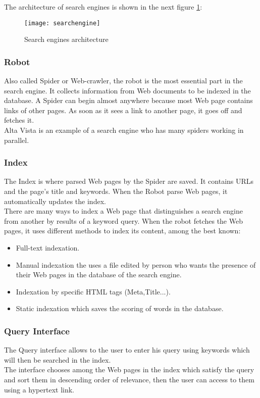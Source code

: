 The architecture of search engines is shown in the next figure \ref{fig_search_engine}:

\begin{figure}[H]
\centering
\texttt{[image: searchengine]}
\caption{Search engines architecture }
\label{fig_search_engine}
\end{figure}

\subsubsection{Robot}
Also called Spider or Web-crawler, the robot is the most essential part in the search engine. It collects information from Web documents to be indexed in the database. A Spider can begin almost anywhere because most Web page contains links of other pages. As soon as it sees a link to another page, it goes off and fetches it. \\Alta Vista is an example of a search engine who has many spiders working in parallel\cite{spider}.
\subsubsection{Index}
The Index is where parsed Web pages by the Spider are saved. It contains URLs and the page's title and keywords. When the Robot parse Web pages, it automatically updates the index.\\
There are many ways to index a Web page that distinguishes a search engine from another by results of a keyword query. When the robot fetches the Web pages, it uses different methods to index its content, among the best known:\begin{itemize}
    \item Full-text indexation.
    \item Manual indexation the uses a file edited by person who wants the presence of their Web pages in the database of the search engine. 
    \item Indexation by specific HTML tags (Meta,Title...).
    \item Static indexation which saves the scoring of words in the database.
\end{itemize}
\subsubsection{Query Interface}
The Query interface allows to the user to enter his query using keywords which will then be searched in the index.\\
The interface chooses among the Web pages in the index which satisfy the query and sort them in descending order of relevance, then the user can access to them using a hypertext link. 


